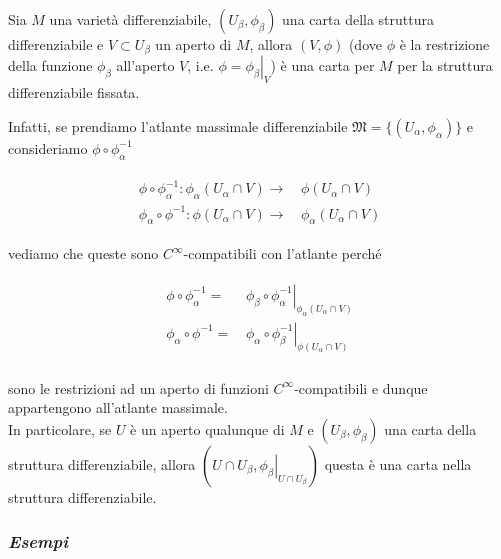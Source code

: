 \begin{remark}
	Sia $ M $ una varietà differenziabile, $ (U_{\beta},\phi_{\beta}) $ una carta della struttura differenziabile e $ V \subset U_{\beta} $ un aperto di $ M $, allora $ (V,\phi) $ (dove $ \phi $ è la restrizione della funzione $ \phi_{\beta} $ all'aperto $ V $, i.e. $ \phi = \left. \phi_{\beta} \right|_{V} $) è una carta per $ M $ per la struttura differenziabile fissata.
\end{remark}

Infatti, se prendiamo l'atlante massimale differenziabile $ \mathfrak{M} = \{(U_{\alpha},\phi_{\alpha})\} $ e consideriamo $ \phi \circ \phi_{\alpha}^{-1} $

\begin{align}
	\begin{split}
		\phi \circ \phi_{\alpha}^{-1} : \phi_{\alpha}(U_{\alpha} \cap V) \to& \, \phi(U_{\alpha} \cap V)\\
		\phi_{\alpha} \circ \phi^{-1} : \phi(U_{\alpha} \cap V) \to& \, \phi_{\alpha}(U_{\alpha} \cap V)
	\end{split}
\end{align}

vediamo che queste sono $ C^{\infty} $-compatibili con l'atlante perché

\begin{align}
	\begin{split}
		\phi \circ \phi_{\alpha}^{-1} =& \, \left. \phi_{\beta} \circ \phi_{\alpha}^{-1} \right|_{\phi_{\alpha}(U_{\alpha} \cap V)}\\
		\phi_{\alpha} \circ \phi^{-1} =& \, \left. \phi_{\alpha} \circ \phi_{\beta}^{-1} \right|_{\phi(U_{\alpha} \cap V)}\\
	\end{split}
\end{align}

sono le restrizioni ad un aperto di funzioni $ C^{\infty} $-compatibili e dunque appartengono all'atlante massimale.\\
In particolare, se $ U $ è un aperto qualunque di $ M $ e $ (U_{\beta},\phi_{\beta}) $ una carta della struttura differenziabile, allora $ (U \cap U_{\beta},\left. \phi_{\beta} \right|_{U \cap U_{\beta}}) $ questa è una carta nella struttura differenziabile.

\subsubsection{\textit{Esempi}}

